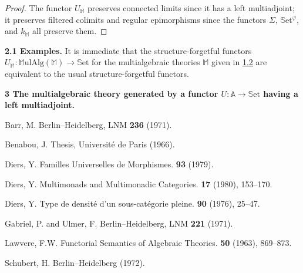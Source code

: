 \documentclass{article}
\newenvironment{rmenv}[1]
  {\phantomsection\par\medskip\noindent\textbf{#1.}\rmfamily}
  {\medskip}
\newcommand{\bb}[1]{{\mathbb{#1}}}
\newcommand{\Set}{\mathbb{S}\mathrm{et}}
\newcommand{\MulAlg}{\mathbb{M}\mathrm{ulAlg}}
\begin{document}
\begin{proof}
  The functor $U_\bb{M}$ preserves connected limits since it has a left multiadjoint; it preserves filtered colimits and regular epimorphisms since the functors $\Sigma$, $\Set^\varphi$, and $k_\bb{M}$ all preserve them.
\end{proof}

\begin{rmenv}{2.1 Examples}
  It is immediate that the structure-forgetful functors $U_\bb{M}\colon\MulAlg(\bb{M})\to\Set$ for the multialgebraic theories $\bb{M}$ given in \hyperref[1.2]{1.2} are equivalent to the usual structure-forgetful functors.
\end{rmenv}

\begin{rmenv}{3 The multialgebraic theory generated by a functor $U\colon\bb{A}\to\Set$ having a left multiadjoint}
\end{rmenv}






\nocite{*}

\begin{thebibliography}{8}

  {\sc Barr, M.}
  \newblock Berlin--Heidelberg, LNM \textbf{236} (1971).

  {\sc Benabou, J.}
  \newblock Thesis, Universit\'{e} de Paris (1966).

  {\sc Diers, Y.}
  \newblock Familles Universelles de Morphismes.
   \textbf{93} (1979).

  {\sc Diers, Y.}
  \newblock Multimonads and Multimonadic Categories.
   \textbf{17} (1980), 153--170.

  {\sc Diers, Y.}
  \newblock Type de densit\'{e} d'un sous-cat\'{e}gorie pleine.
   \textbf{90} (1976), 25--47.

  {\sc Gabriel, P. and Ulmer, F.}
  \newblock Berlin--Heidelberg, LNM \textbf{221} (1971).

  {\sc Lawvere, F.W.}
  \newblock Functorial Semantics of Algebraic Theories.
   \textbf{50} (1963), 869--873.

  {\sc Schubert, H.}
  \newblock Berlin--Heidelberg (1972).

\end{thebibliography}
\end{document}
